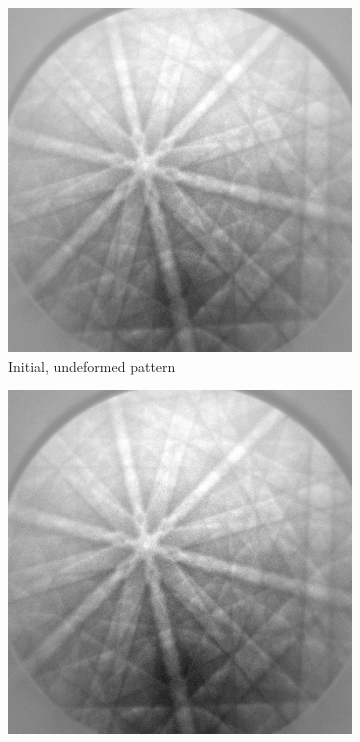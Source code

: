 \begin{figure}
	
	\begin{subfigure}{.5\textwidth}
		\centering
		\includegraphics[width=.9\linewidth]{img/roi_shifts_initial}
		\caption{Initial, undeformed pattern}
		\label{roi-shifts:initial}
	\end{subfigure}%
	\begin{subfigure}{.5\textwidth}
		\centering
		\includegraphics[width=.9\linewidth]{img/DEFORMED_x3600y6235}

\end{subfigure}
\end{figure}
